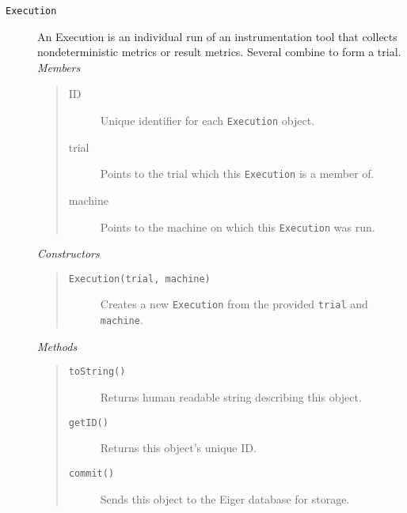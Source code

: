 \begin{description}
\item[\texttt{Execution}] An Execution is an individual run of an instrumentation tool that collects nondeterministic metrics or result metrics. Several combine to form a trial.
  {\em Members}
	\begin{quote}
	\begin{description}
    \item[ID] Unique identifier for each \texttt{Execution} object.
	\item[trial] Points to the trial which this \texttt{Execution} is a member of.
	\item[machine] Points to the machine on which this \texttt{Execution} was run.
	\end{description}
	\end{quote}
  {\em Constructors}
	\begin{quote}
	\begin{description}
  	\item[\texttt{Execution(trial, machine)}] Creates a new \texttt{Execution} from the provided \texttt{trial} and \texttt{machine}.
	\end{description}
	\end{quote}
  {\em Methods}
	\begin{quote}
	\begin{description}
    \item[\texttt{toString()}] Returns human readable string describing this object.
	\item[\texttt{getID()}] Returns this object's unique ID.
	\item[\texttt{commit()}] Sends this object to the Eiger database for storage.
	\end{description}
	\end{quote}


\end{description}
